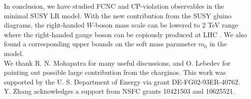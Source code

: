 \documentclass[prd,aps,preprint,tightenlines,superscriptaddress]{revtex4}
\begin{document}
In conclusion, we have studied FCNC and CP-violation observables in the minimal SUSY LR
model. With the new contribution from the SUSY gluino diagrams, the right-handed $W$-boson
mass scale can be lowered to 2 TeV range where the right-handed gauge boson can be copiously 
produced at LHC . We also found a corresponding upper bounds on
the soft mass parameter $m_0$ in the model.\\

We thank R. N. Mohapatra for many useful discussions, and O. Lebedev for pointing out
possible large contribution from the charginos. This work was supported by the U. S.
Department of Energy via grant DE-FG02-93ER-40762. Y. Zhang acknowledges a support from
NSFC grants 10421503 and 10625521.

\end{document}
